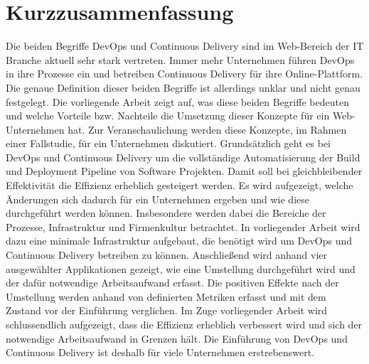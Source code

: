 \section*{Kurzzusammenfassung}
Die beiden Begriffe DevOps und Continuous Delivery sind im Web-Bereich der IT Branche aktuell sehr stark vertreten. Immer mehr Unternehmen führen DevOps in ihre Prozesse ein und betreiben Continuous Delivery für ihre Online-Plattform. Die genaue Definition dieser beiden Begriffe ist allerdings unklar und nicht genau festgelegt. Die vorliegende Arbeit zeigt auf, was diese beiden Begriffe bedeuten und welche Vorteile bzw. Nachteile die Umsetzung dieser Konzepte für ein Web-Unternehmen hat. Zur Veranschaulichung werden diese Konzepte, im Rahmen einer Fallstudie, für ein Unternehmen diskutiert. Grundsätzlich geht es bei DevOps und Continuous Delivery um die vollständige Automatisierung der Build und Deployment Pipeline von Software Projekten. Damit soll bei gleichbleibender Effektivität die Effizienz erheblich gesteigert werden. Es wird aufgezeigt, welche Änderungen sich dadurch für ein Unternehmen ergeben und wie diese durchgeführt werden können. Insbesondere werden dabei die Bereiche der Prozesse, Infrastruktur und Firmenkultur betrachtet. In vorliegender Arbeit wird dazu eine minimale Infrastruktur aufgebaut, die benötigt wird um DevOps und Continuous Delivery betreiben zu können. Anschließend wird anhand vier ausgewählter Applikationen gezeigt, wie eine Umstellung durchgeführt wird  und der dafür notwendige Arbeitsaufwand erfasst. Die positiven Effekte nach der Umstellung werden anhand von definierten Metriken erfasst und mit dem Zustand vor der Einführung verglichen. Im Zuge vorliegender Arbeit wird schlussendlich aufgezeigt, dass die Effizienz erheblich verbessert wird und sich der notwendige Arbeitsaufwand in Grenzen hält. Die Einführung von DevOps und Continuous Delivery ist deshalb für viele Unternehmen erstrebenswert.


\newpage
